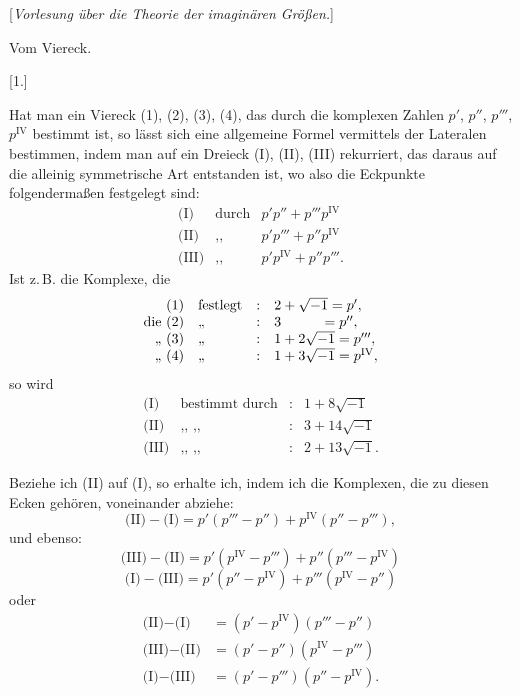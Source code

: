 
\begin{center}
[\emph{Vorlesung über die Theorie der imaginären Größen.}]

Vom Viereck.

[1.]
\end{center}

Hat man ein Viereck (1), (2), (3), (4), das durch die komplexen Zahlen $p'$, $p''$, $p'''$,
$p^{\mathrm{IV}}$ bestimmt ist, so lässt sich eine allgemeine Formel vermittels der Lateralen
bestimmen, indem man auf ein Dreieck (I), (II), (III) rekurriert, das daraus auf die alleinig
symmetrische Art entstanden ist, wo also die Eckpunkte folgendermaßen festgelegt sind:
\[
\begin{array}{rll}
\text{(I)} & \text{durch} & p'p'' + p'''p^{\mathrm{IV}} \\
\text{(II)} & \text{,,} & p'p''' + p'' p^{\mathrm{IV}} \\
\text{(III)} & \text{,,} & p'p^{\mathrm{IV}} + p'' p'''.
\end{array}
\]
Ist z.\,B. die Komplexe, die
\[
\begin{array}{rlll}
\text{(1)} & \text{festlegt} & : & 2 + \sqrt{-1} = p', \\
\text{die (2)} & \text{,,} & : & 3 \hspace{2.8em} = p'', \\
\text{,, (3)} & \text{,,} & : & 1 + 2\sqrt{-1} = p''', \\
\text{,, (4)} & \text{,,} & : & 1 + 3\sqrt{-1} = p^{\mathrm{IV}},
\end{array}
\]
so wird
\[
\begin{array}{rlll}
\text{(I)} & \text{bestimmt durch} & : & 1 + 8\sqrt{-1} \\
\text{(II)} & \text{,, ,,} & : & 3 + 14\sqrt{-1} \\
\text{(III)} & \text{,, ,,} & : & 2 + 13\sqrt{-1}.
\end{array}
\]

Beziehe ich (II) auf (I), so erhalte ich, indem ich die Komplexen, die zu diesen Ecken gehören,
voneinander abziehe:
\[
\text{(II)} - \text{(I)} = p'(p''' - p'') + p^{\mathrm{IV}}(p'' - p'''),
\]
und ebenso:
\[
\text{(III)} - \text{(II)} = p'(p^{\mathrm{IV}} - p''') + p'' (p''' - p^{\mathrm{IV}})
\]
\[
\text{(I)} - \text{(III)} = p'(p'' - p^{\mathrm{IV}}) + p'''(p^{\mathrm{IV}} - p'')
\]
oder
\[
\begin{array}{rl}
\text{(II)} - \text{(I)} & = (p' - p^{\mathrm{IV}})(p''' - p'') \\
\text{(III)} - \text{(II)} & = (p' - p'')(p^{\mathrm{IV}} - p''') \\
\text{(I)} - \text{(III)} & = (p' - p''')(p'' - p^{\mathrm{IV}}).
\end{array}
\]


